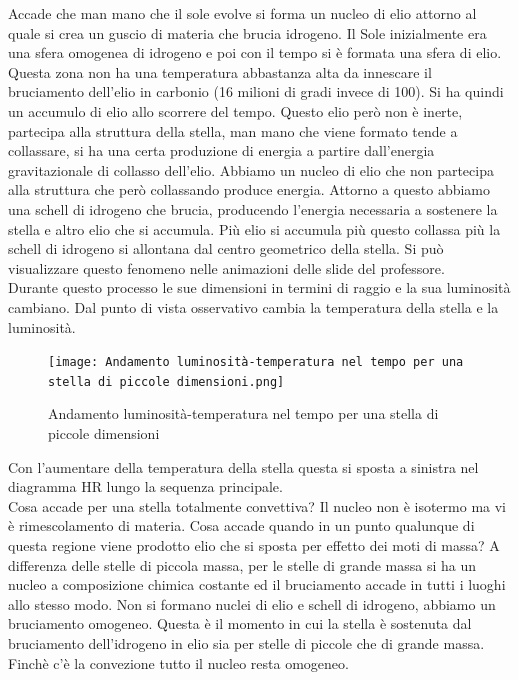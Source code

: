 \documentclass[a4paper,11pt]{article}
\begin{document}
    Accade che man mano che il sole evolve si forma un nucleo di elio attorno al quale si crea un guscio di materia che brucia idrogeno. Il Sole inizialmente era una sfera omogenea di idrogeno e poi con il tempo si è formata una sfera di elio. Questa zona non ha una temperatura abbastanza alta da innescare il bruciamento dell'elio in carbonio (16 milioni di gradi invece di 100). Si ha quindi un accumulo di elio allo scorrere del tempo. Questo elio però non è inerte, partecipa alla struttura della stella, man mano che viene formato tende a collassare, si ha una certa produzione di energia a partire dall'energia gravitazionale di collasso dell'elio. Abbiamo un nucleo di elio che non partecipa alla struttura che però collassando produce energia. Attorno a questo abbiamo una schell di idrogeno che brucia, producendo l'energia necessaria a sostenere la stella e altro elio che si accumula. Più elio si accumula più questo collassa più la schell di idrogeno si allontana dal centro geometrico della stella. Si può visualizzare questo fenomeno nelle animazioni delle slide del professore. \\
    Durante questo processo le sue dimensioni in termini di raggio e la sua luminosità cambiano. Dal punto di vista osservativo cambia la temperatura della stella e la luminosità. 
    
    \begin{figure}[h!!]
        \centering
        \texttt{[image: Andamento luminosità-temperatura nel tempo per una stella di piccole dimensioni.png]}
        \caption{Andamento luminosità-temperatura nel tempo per una stella di piccole dimensioni}
        \label{fig:Andamento luminosità-temperatura nel tempo per una stella di piccole dimensioni}
    \end{figure}
  
    Con l'aumentare della temperatura della stella questa si sposta a sinistra nel diagramma HR lungo la sequenza principale.\\
    Cosa accade per una stella totalmente convettiva? Il nucleo non è isotermo ma vi è rimescolamento di materia. Cosa accade quando in un punto qualunque di questa regione viene prodotto elio che si sposta per effetto dei moti di massa? A differenza delle stelle di piccola massa, per le stelle di grande massa si ha un nucleo a composizione chimica costante ed il bruciamento accade in tutti i luoghi allo stesso modo. Non si formano nuclei di elio e schell di idrogeno, abbiamo un bruciamento omogeneo. Questa è il momento in cui la stella è sostenuta dal bruciamento dell'idrogeno in elio sia per stelle di piccole che di grande massa. Finchè c'è la convezione tutto il nucleo resta omogeneo. 
    
\end{document}
